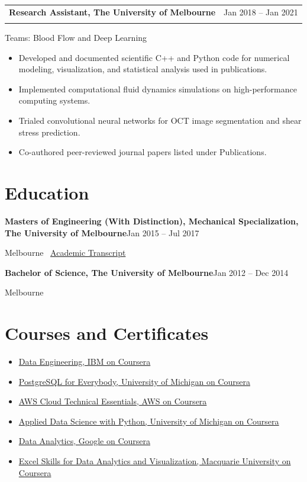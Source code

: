\documentclass[10pt,a4paper]{article}
\makeatletter
\newcommand{\resumesection}[1]{\section*{#1}}
\newenvironment{resumejob}[3]{
  \par\addvspace{0.45em}
  \noindent\begin{tabularx}{\textwidth}{@{}>{\raggedright\arraybackslash}X>{\raggedleft\arraybackslash}p{0.3\textwidth}@{}}
    \textbf{\textcolor{textdark}{#1}} & \textcolor{mutedtext}{#2} \\
    \multicolumn{2}{@{}l@{}}{\textit{\textcolor{mutedtext}{#3}}}
  \end{tabularx}
  \vspace{-0.55em}
}{
  \par\addvspace{0.2em}
}
\makeatother
\begin{document}
\begin{resumejob}{Research Assistant, The University of Melbourne}{Jan 2018 -- Jan 2021}{Melbourne}
Teams: Blood Flow and Deep Learning
\begin{itemize}
  \item Developed and documented scientific C++ and Python code for numerical modeling, visualization, and statistical analysis used in publications.
  \item Implemented computational fluid dynamics simulations on high-performance computing systems.
  \item Trialed convolutional neural networks for OCT image segmentation and shear stress prediction.
  \item Co-authored peer-reviewed journal papers listed under Publications.
\end{itemize}
\end{resumejob}

\resumesection{Education}
\textbf{Masters of Engineering (With Distinction), Mechanical Specialization, The University of Melbourne}\hfill Jan 2015 -- Jul 2017\par
Melbourne \textbar\ \href{https://www.myequals.net/r/sharelink/39bf60f2-2f95-49f6-9c2f-03867a939c90/4a5a7492-b23c-4e9e-87b3-d58a3a20dd87}{Academic Transcript}\par
\vspace{0.3em}
\textbf{Bachelor of Science, The University of Melbourne}\hfill Jan 2012 -- Dec 2014\par
Melbourne

\resumesection{Courses and Certificates}
\begin{itemize}
  \item \href{https://coursera.org/share/e7c8acd9ef97ec13153d23b97eb3ae3d}{Data Engineering, IBM on Coursera}
  \item \href{https://coursera.org/share/a9b1cae25a73e890d4bf699594b8171b}{PostgreSQL for Everybody, University of Michigan on Coursera}
  \item \href{https://coursera.org/share/5eeef59e6fec2ea34ab6729866b8c30a}{AWS Cloud Technical Essentials, AWS on Coursera}
  \item \href{https://www.coursera.org/account/accomplishments/specialization/certificate/XCXYLXJZ4CHS}{Applied Data Science with Python, University of Michigan on Coursera}
  \item \href{https://www.coursera.org/account/accomplishments/specialization/certificate/BK4XG9PK8ESF}{Data Analytics, Google on Coursera}
  \item \href{https://www.coursera.org/account/accomplishments/specialization/certificate/ZDETFK6UQFGF}{Excel Skills for Data Analytics and Visualization, Macquarie University on Coursera}
\end{itemize}
\end{document}
